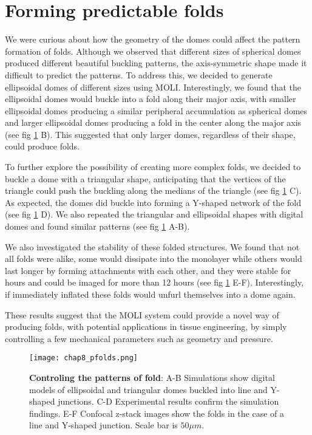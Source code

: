 \hypertarget{forming-predictable-folds}{%
	\section{Forming predictable folds}\label{forming-predictable-folds}}

We were curious about how the geometry of the domes could affect the pattern formation of folds. Although we observed that different sizes of spherical domes produced different beautiful buckling patterns, the axis-symmetric shape made it difficult to predict the patterns. To address this, we decided to generate ellipsoidal domes of different sizes using MOLI. Interestingly, we found that the ellipsoidal domes would buckle into a fold along their major axis, with smaller ellipsoidal domes producing a similar peripheral accumulation as spherical domes and larger ellipsoidal domes producing a fold in the center along the major axis (see fig \ref{fig_8_7} B). This suggested that only larger domes, regardless of their shape, could produce folds.

To further explore the possibility of creating more complex folds, we decided to buckle a dome with a triangular shape, anticipating that the vertices of the triangle could push the buckling along the medians of the triangle (see fig \ref{fig_8_7} C). As expected, the domes did buckle into forming a Y-shaped network of the fold (see fig \ref{fig_8_7} D). We also repeated the triangular and ellipsoidal shapes with digital domes and found similar patterns (see fig \ref{fig_8_7} A-B).

We also investigated the stability of these folded structures. We found that not all folds were alike, some would dissipate into the monolayer while others would last longer by forming attachments with each other, and they were stable for hours and could be imaged for more than 12 hours (see fig \ref{fig_8_7} E-F). Interestingly, if immediately inflated these folds would unfurl themselves into a dome again.

These results suggest that the MOLI system could provide a novel way of producing folds, with potential applications in tissue engineering, by simply controlling a few mechanical parameters such as geometry and pressure.

\begin{figure}
	\centering
	\texttt{[image: chap8\_pfolds.png]}
	\caption{\label{fig_8_7} \textbf{Controling the patterns of fold}: A-B Simulations show digital models of ellipsoidal and triangular domes buckled into line and Y-shaped junctions. C-D Experimental results confirm the simulation findings. E-F Confocal z-stack images show the folds in the case of a line and Y-shaped junction. Scale bar is $50\mu m$.	}
\end{figure}



